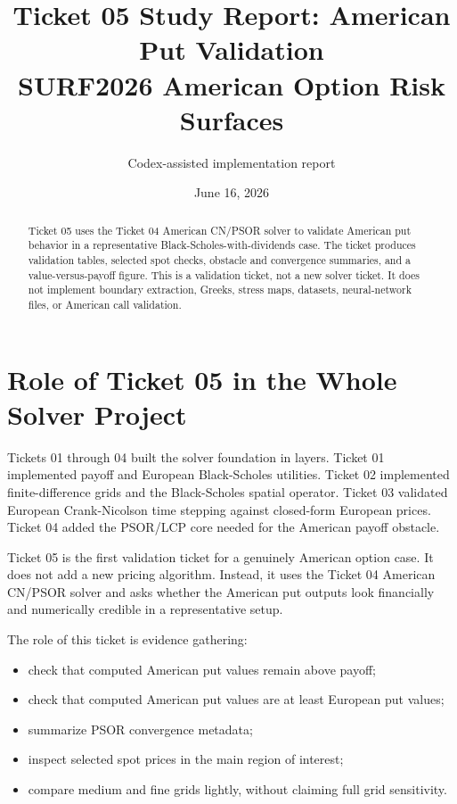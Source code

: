 \documentclass[11pt,a4paper]{article}
\title{\textbf{Ticket 05 Study Report: American Put Validation}\\
\large SURF2026 American Option Risk Surfaces}
\author{Codex-assisted implementation report}
\date{June 16, 2026}
\begin{document}
\maketitle

\begin{abstract}
Ticket 05 uses the Ticket 04 American CN/PSOR solver to validate American put behavior in a
representative Black-Scholes-with-dividends case. The ticket produces validation tables, selected
spot checks, obstacle and convergence summaries, and a value-versus-payoff figure. This is a
validation ticket, not a new solver ticket. It does not implement boundary extraction, Greeks,
stress maps, datasets, neural-network files, or American call validation.
\end{abstract}

\tableofcontents
\newpage

\section{Role of Ticket 05 in the Whole Solver Project}

Tickets 01 through 04 built the solver foundation in layers. Ticket 01 implemented payoff and
European Black-Scholes utilities. Ticket 02 implemented finite-difference grids and the
Black-Scholes spatial operator. Ticket 03 validated European Crank-Nicolson time stepping against
closed-form European prices. Ticket 04 added the PSOR/LCP core needed for the American payoff
obstacle.

Ticket 05 is the first validation ticket for a genuinely American option case. It does not add a
new pricing algorithm. Instead, it uses the Ticket 04 American CN/PSOR solver and asks whether the
American put outputs look financially and numerically credible in a representative setup.

The role of this ticket is evidence gathering:
\begin{itemize}
  \item check that computed American put values remain above payoff;
  \item check that computed American put values are at least European put values;
  \item summarize PSOR convergence metadata;
  \item inspect selected spot prices in the main region of interest;
  \item compare medium and fine grids lightly, without claiming full grid sensitivity.
\end{itemize}
\end{document}
